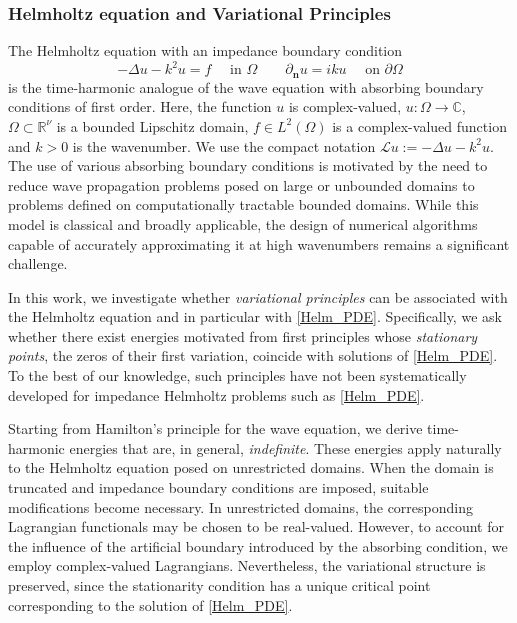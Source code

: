 \documentclass[twoside,11pt]{article}
\def\dimx{\nu }
\def\L{{\mathscr{L}}}
\def\L{{\mathscr{L}}}
\begin{document}
\subsubsection*{Helmholtz equation and Variational Principles}\label{Se:1NN}
 {The Helmholtz equation with an impedance %
boundary condition }
\begin{equation}\label{Helm_PDE}
  -\Delta u - k^2 u = f\quad \text{ in }  \varOmega 
  \qquad \partial_{\mathbf{n}} u = i k  u \quad \text{ on }  \partial\varOmega
\end{equation}
%
 {is the time-harmonic analogue of the wave equation with absorbing boundary conditions of first order. Here, the function $u$ is  complex-valued, 
 $u:\varOmega\to\mathbb{C}$, $ \varOmega\subset\mathbb{R}^{\dimx}$ is a bounded Lipschitz domain, $f\in L^2(\varOmega)$ is a complex-valued function and $k>0$ is the wavenumber.}
{We use the compact notation $\L u:=-\Delta u - k^2 u$.}
 {The use of various absorbing boundary conditions is motivated by the need to reduce wave propagation problems posed on large or unbounded domains to problems defined on computationally tractable bounded domains.} 
{While this model is classical and broadly applicable, the design of numerical algorithms capable of accurately approximating it at high wavenumbers remains a significant challenge.}



In this work, we investigate whether \emph{variational principles} can be associated with the Helmholtz equation and in particular with \eqref{Helm_PDE}.   {Specifically, we ask whether there exist energies motivated from first principles  whose \emph{stationary points}, the zeros of their first variation, coincide with solutions of \eqref{Helm_PDE}. }
To the best of our knowledge, such principles have not been systematically  {developed for impedance Helmholtz problems such as \eqref{Helm_PDE}.} 
 

 {Starting from Hamilton's principle for the wave equation, we derive time-harmonic energies that are, in general, \emph{indefinite}. These energies apply naturally to the Helmholtz equation posed on unrestricted domains. When the domain is truncated and impedance boundary conditions are imposed, suitable modifications  become necessary. 
In unrestricted domains, the corresponding Lagrangian functionals may be chosen to be real-valued. However, to account for the influence of the artificial boundary introduced by the absorbing condition, we employ complex-valued Lagrangians. Nevertheless, the variational structure is preserved, since the stationarity condition has a unique critical point corresponding to the solution of \eqref{Helm_PDE}.}
\end{document}
